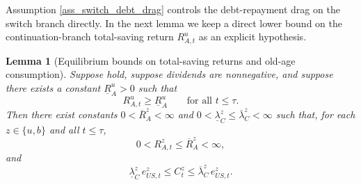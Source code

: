 \documentclass[12pt]{article}
\theoremstyle{plain}
\newtheorem{lem}{Lemma}
\begin{document}
Assumption \ref{ass_switch_debt_drag} controls the debt-repayment drag on the switch branch directly. In the next lemma we keep a direct lower bound on the continuation-branch total-saving return $R_{A,t}^u$ as an explicit hypothesis.

\begin{lem}[Equilibrium bounds on total-saving returns and old-age consumption]\label{lem_total_return_consumption_bounds}
Suppose
hold, suppose dividends are nonnegative, and suppose there exists a constant $\underline R_A^u>0$ such that
\[
R_{A,t}^u\ge \underline R_A^u
\qquad\text{for all }t\le\tau.
\]
Then there exist constants $0< \overline R^z_A<\infty$ and
$0<\underline\lambda^z_C\le \overline\lambda^z_C<\infty$ such that, for each $z\in\{u,b\}$ and all $t\le\tau$,
\[
0< R_{A,t}^z\le \overline R^z_A<\infty,
\]
and
\[
\underline\lambda^z_C\,e_{US,t}^z
\le
C_t^z
\le
\overline\lambda^z_C\,e_{US,t}^z.
\]
\end{lem}
\end{document}
